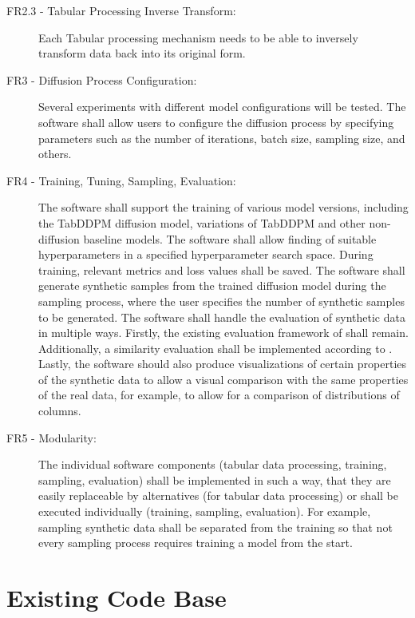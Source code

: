 \begin{description}
		\item[FR2.3 - Tabular Processing Inverse Transform:]
		Each Tabular processing mechanism needs to be able to inversely transform data back into its original form.

		\item[FR3 - Diffusion Process Configuration:]
		Several experiments with different model configurations will be tested.
		The software shall allow users to configure the diffusion process by specifying parameters such as the number of iterations, batch size, sampling size, and others.

		\item[FR4 - Training, Tuning, Sampling, Evaluation:]
		The software shall support the training of various model versions, including the TabDDPM diffusion model, variations of TabDDPM and other non-diffusion baseline models.
		The software shall allow finding of suitable hyperparameters in a specified hyperparameter search space.
		During training, relevant metrics and loss values shall be saved.
		The software shall generate synthetic samples from the trained diffusion model during the sampling process, where the user specifies the number of synthetic samples to be generated.
		The software shall handle the evaluation of synthetic data in multiple ways.
		Firstly, the existing evaluation framework of \cite{kotelnikov2022TabDDPMModellingTabular} shall remain.
		Additionally, a similarity evaluation shall be implemented according to \cite{chundawat2022UniversalMetricRobust}.
		Lastly, the software should also produce visualizations of certain properties of the synthetic data to allow a visual comparison with the same properties of the real data, for example, to allow for a comparison of distributions of columns.

	\item[FR5 - Modularity:]
		The individual software components (tabular data processing, training, sampling, evaluation) shall be implemented in such a way,
		that they are easily replaceable by alternatives (for tabular data processing) or shall be executed individually (training, sampling, evaluation).
		For example, sampling synthetic data shall be separated from the training so that not every sampling process requires training a model from the start.
\end{description}


\section{Existing Code Base}
\label{ch:conceptualDesign-existingCodeBase}


